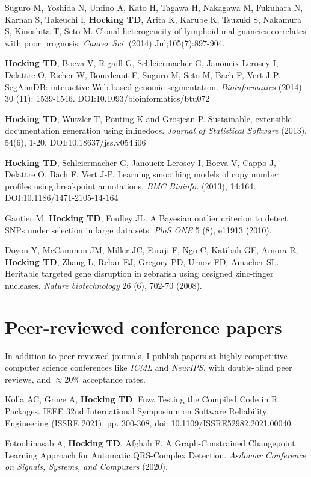 \documentclass[margin,line]{res}
\begin{document}
\begin{resume}
Suguro M, Yoshida N, Umino A, Kato H, Tagawa H, Nakagawa M, Fukuhara
N, Karnan S, Takeuchi I, {\bf Hocking TD}, Arita K, Karube K, Tsuzuki
S, Nakamura S, Kinoshita T, Seto M. Clonal heterogeneity of lymphoid
malignancies correlates with poor prognosis. {\it Cancer Sci.} (2014)
Jul;105(7):897-904.

{\bf Hocking TD}, Boeva V, Rigaill G, Schleiermacher G,
Janoueix-Lerosey I, Delattre O, Richer W, Bourdeaut F, Suguro M, Seto
M, Bach F, Vert J-P. SegAnnDB: interactive Web-based genomic
segmentation. {\it Bioinformatics} (2014) 30 (11):
1539-1546. DOI:10.1093/bioinformatics/btu072

{\bf Hocking TD}, Wutzler T, Ponting K and Grosjean P. Sustainable,
extensible documentation generation using inlinedocs. {\it Journal of
Statistical Software} (2013), 54(6), 1-20. DOI:10.18637/jss.v054.i06

{\bf Hocking TD}, Schleiermacher G, Janoueix-Lerosey I, Boeva V, Cappo
J, Delattre O, Bach F, Vert J-P. Learning smoothing models of copy
number profiles using breakpoint annotations. {\it BMC Bioinfo.} (2013),
14:164. DOI:10.1186/1471-2105-14-164

Gautier M, {\bf Hocking TD}, Foulley JL. A Bayesian outlier criterion
to detect SNPs under selection in large data sets. {\it PloS ONE} 5
(8), e11913 (2010).

Doyon Y, McCammon JM, Miller JC, Faraji F, Ngo C, Katibah GE, Amora R,
{\bf Hocking TD}, Zhang L, Rebar EJ, Gregory PD, Urnov FD, Amacher
SL. Heritable targeted gene disruption in zebrafish using designed
zinc-finger nucleases. {\it Nature biotechnology} 26 (6), 702-70
(2008).

\section{\sc Peer-reviewed conference papers}

In addition to peer-reviewed journals, I publish papers at
highly competitive computer science conferences like {\it ICML} and {\it NeurIPS}, with
double-blind peer reviews, and $\approx$20\% acceptance rates.

Kolla AC, Groce A, {\bf Hocking TD}. Fuzz Testing the Compiled Code in
R Packages. IEEE 32nd International Symposium on Software
Reliability Engineering (ISSRE 2021), pp. 300-308, doi:
10.1109/ISSRE52982.2021.00040.

Fotoohinasab A, {\bf Hocking TD}, Afghah F. A Graph-Constrained
Changepoint Learning Approach for Automatic QRS-Complex
Detection. {\it Asilomar Conference on Signals, Systems, and
  Computers} (2020).


\end{resume}
\end{document}
